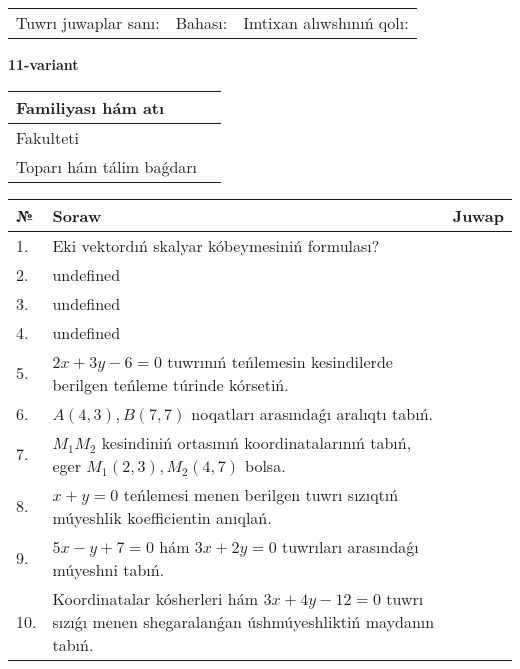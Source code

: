 \documentclass{article}
\begin{document}
\vspace{0.7cm}

\begin{tabular}{lll}
Tuwrı juwaplar sanı: \underline{\hspace{1cm}} & 
Bahası: \underline{\hspace{1cm}} & 
Imtixan alıwshınıń qolı: \underline{\hspace{2cm}} \\
\end{tabular}

\egroup

\newpage


\textbf{11-variant}\\

\bgroup
\def\arraystretch{1.6} %

\begin{tabular}{|m{5.7cm}|m{9.5cm}|}
\hline
Familiyası hám atı & \\
\hline
Fakulteti  & \\
\hline
Toparı hám tálim baǵdarı  & \\
\hline
\end{tabular}

\vspace{0.7cm}

\begin{tabular}{|m{0.7cm}|m{10cm}|m{4cm}|}
\hline
№ & Soraw & Juwap \\
\hline
1. & Eki vektordıń skalyar kóbeymesiniń formulası? &  \\
\hline
2. & undefined &  \\
\hline
3. & undefined &  \\
\hline
4. & undefined &  \\
\hline
5. & \(2 x + 3 y - 6 = 0\) tuwrınıń teńlemesin kesindilerde berilgen teńleme túrinde kórsetiń. &  \\
\hline
6. & \(A (4, 3), B (7, 7)\) noqatları arasındaǵı aralıqtı tabıń. &  \\
\hline
7. & \(M_{1}M_{2}\) kesindiniń ortasınıń koordinatalarınıń tabıń, eger \(M_{1} (2, 3), M_{2} (4, 7)\) bolsa. &  \\
\hline
8. & \(x + y = 0\) teńlemesi menen berilgen tuwrı sızıqtıń múyeshlik koefficientin anıqlań. &  \\
\hline
9. & \(5 x - y + 7 = 0\) hám \(3 x + 2 y = 0\) tuwrıları arasındaǵı múyeshni tabıń. &  \\
\hline
10. & Koordinatalar kósherleri hám \( 3 x + 4 y - 12 = 0 \) tuwrı sızıǵı menen shegaralanǵan úshmúyeshliktiń maydanın tabıń. & \\
\hline
\end{tabular}
\end{document}
